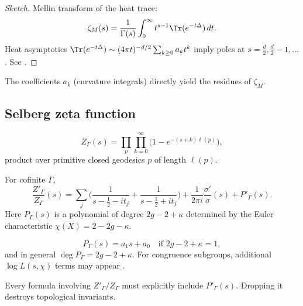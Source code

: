 \begin{proof}[Sketch]
Mellin transform of the heat trace:
\[
\zeta_M(s) = \frac{1}{\Gamma(s)} \int_0^\infty t^{s-1}\Tr(e^{-t\Delta})\,dt.
\]
Heat asymptotics $\Tr(e^{-t\Delta}) \sim (4\pi t)^{-d/2}\sum_{k\ge0} a_k t^k$ 
imply poles at $s=\tfrac d2, \tfrac d2-1, \dots$.  
See \cite{Seeley1967, Minakshi1949}.
\end{proof}

\begin{remark}
The coefficients $a_k$ (curvature integrals) directly yield the residues of $\zeta_M$.
\end{remark}

\subsection{Selberg zeta function}

\begin{definition}
\[
Z_\Gamma(s) = \prod_{p}\prod_{k=0}^\infty \big(1-e^{-(s+k)\ell(p)}\big),
\]
product over primitive closed geodesics $p$ of length $\ell(p)$.
\end{definition}

\begin{theorem}
\label{thm:selbergZ}
For cofinite $\Gamma$,
\[
\frac{Z'_\Gamma}{Z_\Gamma}(s)
= \sum_j \Big(\frac{1}{s-\tfrac12-it_j}+\frac{1}{s-\tfrac12+it_j}\Big)
+ \frac{1}{2\pi i}\frac{\sigma'}{\sigma}(s) + P'_\Gamma(s).
\]
Here $P_\Gamma(s)$ is a polynomial of degree $2g-2+\kappa$ determined 
by the Euler characteristic $\chi(X)=2-2g-\kappa$.
\end{theorem}

\begin{definition}
\label{def:poly}
\[
P_\Gamma(s) = a_1 s + a_0 \quad \text{if $2g-2+\kappa=1$},
\]
and in general $\deg P_\Gamma = 2g-2+\kappa$.  
For congruence subgroups, additional $\log L(s,\chi)$ terms may appear 
\cite{Hejhal1983, Iwaniec2002}.
\end{definition}

\begin{remark}
Every formula involving $Z'_\Gamma/Z_\Gamma$ must explicitly include $P'_\Gamma(s)$.  
Dropping it destroys topological invariants.
\end{remark}

